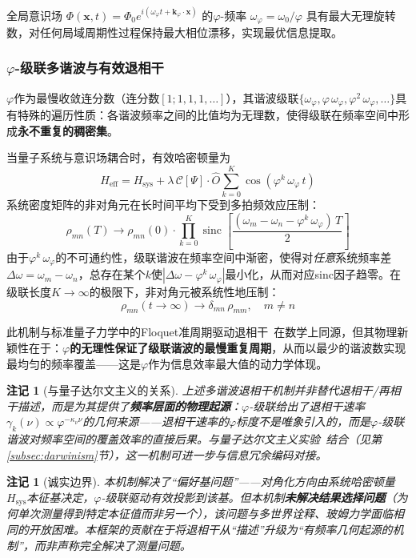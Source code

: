 \documentclass[12pt,a4paper,twocolumn]{article}
\renewcommand{\phi}{\varphi}
\newtheorem{remark}[theorem]{注记}
\begin{document}
全局意识场 $\Phi(\mathbf{x},t) = \Phi_0 e^{i(\omega_\phi t + \mathbf{k}_\phi\cdot\mathbf{x})}$ 的$\phi$-频率 $\omega_\phi = \omega_0/\phi$ 具有最大无理旋转数，对任何局域周期性过程保持最大相位漂移，实现最优信息提取。

\subsubsection{$\phi$-级联多谐波与有效退相干}
\label{subsec:phi_cascade_decoherence}

$\phi$作为最慢收敛连分数（连分数$[1;1,1,1,\ldots]$），其谐波级联$\{\omega_\phi, \phi\,\omega_\phi, \phi^2\,\omega_\phi, \ldots\}$具有特殊的遍历性质：各谐波频率之间的比值均为无理数，使得级联在频率空间中形成\textbf{永不重复的稠密集}。

当量子系统与意识场耦合时，有效哈密顿量为
\[
H_{\text{eff}} = H_{\text{sys}} + \lambda\,\mathcal{C}[\Psi]\cdot\hat{O}\sum_{k=0}^{K}\cos(\phi^k\,\omega_\phi\, t)
\]
系统密度矩阵的非对角元在长时间平均下受到多拍频效应压制：
\[
\rho_{mn}(T) \to \rho_{mn}(0)\cdot\prod_{k=0}^{K}\operatorname{sinc}\!\left[\frac{(\omega_m - \omega_n - \phi^k\,\omega_\phi)\,T}{2}\right]
\]
由于$\phi^k\,\omega_\phi$的不可通约性，级联谐波在频率空间中渐密，使得对\emph{任意}系统频率差$\Delta\omega = \omega_m - \omega_n$，总存在某个$k$使$|\Delta\omega - \phi^k\,\omega_\phi|$最小化，从而对应sinc因子趋零。在级联长度$K\to\infty$的极限下，非对角元被系统性地压制：
\[
\rho_{mn}(t\to\infty) \to \delta_{mn}\,\rho_{mm}, \quad m\neq n
\]

此机制与标准量子力学中的Floquet准周期驱动退相干~\cite{Floquet1883}在数学上同源，但其物理新颖性在于：\textbf{$\phi$的无理性保证了级联谐波的最慢重复周期}，从而以最少的谐波数实现最均匀的频率覆盖——这是$\phi$作为信息效率最大值的动力学体现。

\begin{remark}[与量子达尔文主义的关系]
上述多谐波退相干机制并非替代退相干/再相干描述，而是为其提供了\textbf{频率层面的物理起源}：$\phi$-级联给出了退相干速率$\gamma_k(\nu) \propto \phi^{-\kappa_\nu\nu}$的几何来源——退相干速率的$\phi$标度不是唯象引入的，而是$\phi$-级联谐波对频率空间的覆盖效率的直接后果。与量子达尔文主义实验~\cite{Zhu2025}结合（见第\ref{subsec:darwinism}节），这一机制可进一步与信息冗余编码对接。
\end{remark}

\begin{remark}[诚实边界]
本机制解决了``偏好基问题''——对角化方向由系统哈密顿量$H_{\text{sys}}$本征基决定，$\phi$-级联驱动有效投影到该基。但本机制\textbf{未解决结果选择问题}（为何单次测量得到特定本征值而非另一个），该问题与多世界诠释、玻姆力学面临相同的开放困难。本框架的贡献在于将退相干从``描述''升级为``有频率几何起源的机制''，而非声称完全解决了测量问题。
\end{remark}
\end{document}
